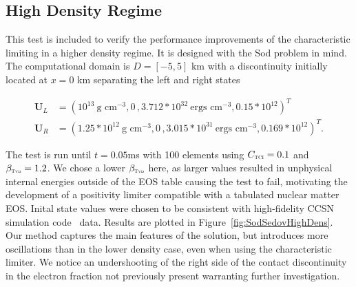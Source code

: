 \documentclass[onecolumn]{aastex62}
\newcommand{\TVD}{\textnormal{\tiny\textsc{Tvd}}}
\newcommand{\TCI}{\textnormal{\tiny\textsc{TCI}}}
\begin{document}
\subsection{High Density Regime}
This test is included to verify the performance improvements of the characteristic
limiting in a higher density regime. It is designed with the Sod problem in mind.
The computational domain is $D = [-5,5]$ km
with a discontinuity initially located at $x = 0$ km separating the left and right states

\begin{align*}
  \mathbf{U}_{L} &= (10^{13}~\text{g~cm}^{-3}, 0\,, 3.712*10^{32}~\text{ergs~cm}^{-3}, 0.15*10^{12})^T\,\,\, \\
  \mathbf{U}_{R} &= (1.25*10^{12}~\text{g~cm}^{-3}, 0\, , 3.015*10^{31}~\text{ergs~cm}^{-3}, 0.169*10^{12})^T.
\end{align*}

\noindent The test is run until $t = 0.05$ms with 100 elements
using $C_{\TCI} = 0.1$ and $\beta_{\TVD} = 1.2$. We chose a lower $\beta_{\TVD}$
here, as larger values resulted in unphysical internal energies outside of the
EOS table causing the test to fail, motivating the development of a
positivity limiter compatible with a tabulated nuclear matter EOS.
Inital state values were chosen to be consistent with
high-fidelity CCSN simulation code \chimera\, \citep{bruenn:2018} data.
Results are plotted in
Figure~\ref{fig:SodSedovHighDens}. Our method captures the main features
of the solution, but introduces more oscillations than in the lower density
case, even when using the characteristic limiter.
We notice an undershooting of the right side
of the contact discontinuity in the electron fraction not previously present
warranting further investigation.
\end{document}

